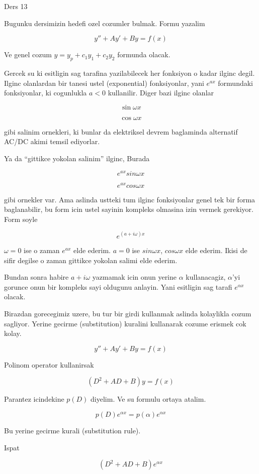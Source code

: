 \documentclass[12pt,fleqn]{article}\usepackage{../common}
\begin{document}
Ders 13

Bugunku dersimizin hedefi ozel cozumler bulmak. Formu yazalim

\[ y'' + Ay' + By = f(x) \]

Ve genel cozum $y = y_p + c_1y_1 + c_2y_2$ formunda olacak. 

Gercek su ki esitligin sag tarafina yazilabilecek her fonksiyon o kadar
ilginc degil. Ilginc olanlardan bir tanesi ustel (exponential)
fonksiyonlar, yani $e^{ax}$ formundaki fonksiyonlar, ki cogunlukla $a<0$
kullanilir. Diger bazi ilginc olanlar 

\[ \sin \omega x \]

\[ \cos \omega x \]

gibi salinim
ornekleri, ki bunlar da elektriksel devrem baglaminda alternatif AC/DC
akimi temsil ediyorlar.

Ya da ``gittikce yokolan salinim'' ilginc, Burada 

\[ e^{ax}sin \omega x \]

\[ e^{ax}cos \omega x \]

gibi ornekler var. Ama aslinda ustteki tum ilginc fonksiyonlar genel tek
bir forma baglanabilir, bu form icin ustel sayinin kompleks olmasina izin
vermek gerekiyor. Form soyle

\[ e^{(a+i\omega)x} \]

$\omega = 0$ ise o zaman $e^{ax}$ elde ederim. $a=0$ ise $sin\omega x$,
$cos\omega x$ elde ederim. Ikisi de sifir degilse o zaman gittikce yokolan
salimi elde ederim. 

Bundan sonra habire $a+i\omega$ yazmamak icin onun yerine $\alpha$
kullanacagiz, $\alpha$'yi gorunce onun bir kompleks sayi oldugunu
anlayin. Yani esitligin sag tarafi $e^{\alpha x}$ olacak. 

Birazdan gorecegimiz uzere, bu tur bir girdi kullanmak aslinda kolaylikla
cozum sagliyor. Yerine gecirme (substitution) kuralini kullanarak cozume
erismek cok kolay. 

\[ y'' + Ay' + By = f(x) \]

Polinom operator kullanirsak

\[ (D^2 + AD + B )y = f(x) \]

Parantez icindekine $p(D)$ diyelim. Ve su formulu ortaya atalim. 

\[ p(D)e^{\alpha x} = p(\alpha)e^{\alpha x}  \]

Bu yerine gecirme kurali (substitution rule). 

Ispat

\[ (D^2 + AD + B )e^{\alpha x} \]
\end{document}
